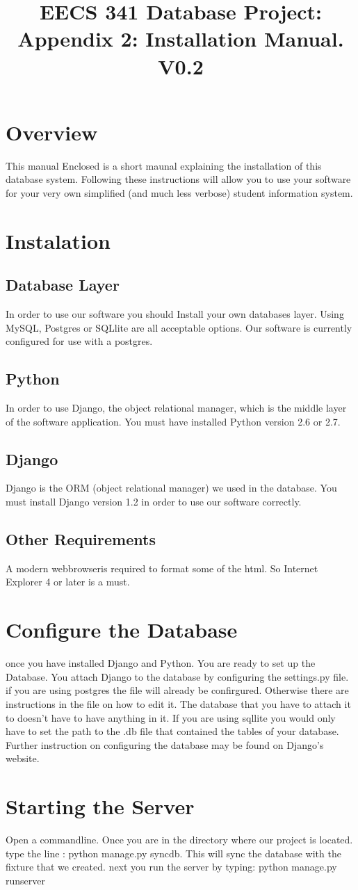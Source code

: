 \documentclass[11pt,oneside,a4paper]{article}
\title{EECS 341 Database Project: Appendix 2: Installation Manual. V0.2}
\begin{document}
\maketitle
\section{Overview}
This manual Enclosed is a short maunal explaining the installation of this database system. Following these instructions will allow you to use your software for your very own simplified (and much less verbose) student information system.  
\section{Instalation}
\subsection{Database Layer}
In order to use our software you should Install your own databases layer.  Using MySQL, Postgres or SQLlite are all acceptable options. Our software is currently configured for use with a postgres.
\subsection{Python}
In order to use Django, the object relational manager, which is the middle layer of the software application.  You must have installed Python version 2.6 or 2.7.
\subsection{Django}
Django is the ORM (object relational manager) we used in the database. You must install Django version 1.2 in order to use our software correctly.
\subsection{Other Requirements}
A modern webbrowseris required to format some of the html.  So Internet Explorer 4 or later is a must. 
\section{Configure the Database}
once you have installed Django and Python. You are ready to set up the Database.  You attach Django to the database by configuring the settings.py file.  if you are using postgres the file will already be confirgured.  Otherwise there are instructions in the file on how to edit it.  The database that you have to attach it to doesn't have to have anything in it.  If you are using sqllite you would only have to set the path to the .db file that contained the tables of your database.  Further instruction on configuring the database may be found on Django's website.  
\section{Starting the Server}
Open a commandline.  Once you are in the directory where our project is located. type the line : python manage.py syncdb.  This will sync the database with the fixture that we created. next you run the server by typing: python manage.py runserver
\end{document}

